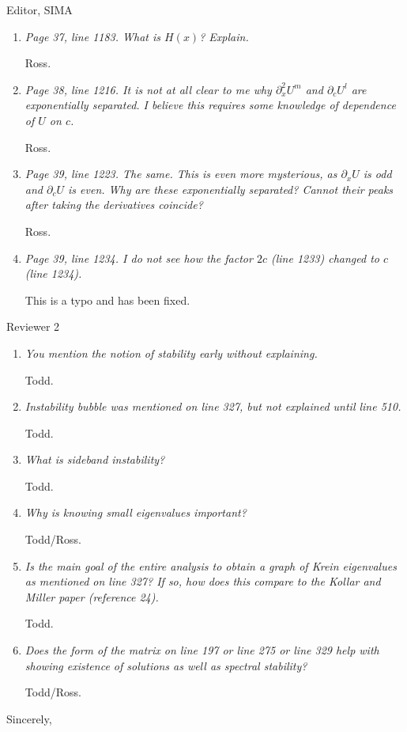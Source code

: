 \documentclass[11pt]{letter}
\begin{document}
\begin{letter}{Editor, SIMA}
\begin{enumerate}
\item \emph{Page 37, line 1183. What is $H(x)$? Explain.}
\vspace{4mm}

Ross.

\item \emph{Page 38, line 1216. It is not at all clear to me why $\partial_x^2 U^m$ and $\partial_c U^l$ are exponentially separated. I believe this requires some knowledge of dependence of $U$ on $c$.}
\vspace{4mm}

Ross.

\item \emph{Page 39, line 1223. The same. This is even more mysterious, as $\partial_x U$ is odd and $\partial_c U$ is even. Why are these exponentially separated? Cannot their peaks after taking the derivatives coincide?}
\vspace{4mm}

Ross.

\item \emph{Page 39, line 1234. I do not see how the factor $2c$ (line 1233) changed to $c$ (line 1234).}
\vspace{4mm}

This is a typo and has been fixed.

\end{enumerate}

Reviewer 2
\begin{enumerate}
\item \emph{You mention the notion of stability early without explaining.}
\vspace{4mm}

Todd.

\item \emph{Instability bubble was mentioned on line 327, but not explained until line 510.}

Todd.

\item \emph{What is sideband instability?} 

Todd.

\item \emph{Why is knowing small eigenvalues important?}

Todd/Ross.

\item \emph{Is the main goal of the entire analysis to obtain a graph of Krein eigenvalues as mentioned on line 327? If so, how does this compare to the Kollar and Miller paper (reference 24). }

Todd.

\item \emph{Does the form of the matrix on line 197 or line 275 or line 329 help with showing existence of solutions as well as spectral stability?}

Todd/Ross.

\end{enumerate}


\closing{Sincerely,}

\end{letter}
\end{document}
